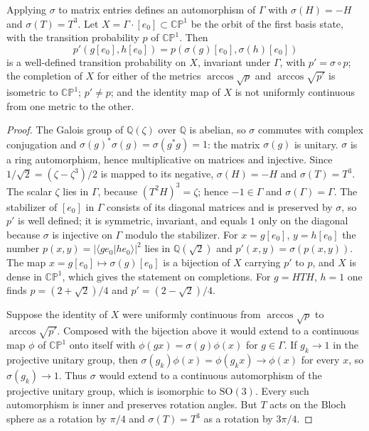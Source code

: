 \begin{proposition}\label{prop:galois}
Applying $\sigma$ to matrix entries defines an automorphism of $\Gamma$ with $\sigma(H)=-H$ and $\sigma(T)=T^3$. Let $X=\Gamma\cdot[e_0]\subset\mathbb{CP}^1$ be the orbit of the first basis state, with the transition probability $p$ of $\mathbb{CP}^1$. Then
\[
p'(g[e_0],h[e_0])=p(\sigma(g)[e_0],\sigma(h)[e_0])
\]
is a well-defined transition probability on $X$, invariant under $\Gamma$, with $p'=\sigma\circ p$; the completion of $X$ for either of the metrics $\arccos\sqrt p$ and $\arccos\sqrt{p'}$ is isometric to $\mathbb{CP}^1$; $p'\ne p$; and the identity map of $X$ is not uniformly continuous from one metric to the other.
\end{proposition}
\begin{proof}
The Galois group of $\mathbb{Q}(\zeta)$ over $\mathbb{Q}$ is abelian, so $\sigma$ commutes with complex conjugation and $\sigma(g)^*\sigma(g)=\sigma(g^*g)=1$: the matrix $\sigma(g)$ is unitary. $\sigma$ is a ring automorphism, hence multiplicative on matrices and injective. Since $1/\sqrt2=(\zeta-\zeta^3)/2$ is mapped to its negative, $\sigma(H)=-H$ and $\sigma(T)=T^3$. The scalar $\zeta$ lies in $\Gamma$, because $(T^2H)^3=\zeta$; hence $-1\in\Gamma$ and $\sigma(\Gamma)=\Gamma$. The stabilizer of $[e_0]$ in $\Gamma$ consists of its diagonal matrices and is preserved by $\sigma$, so $p'$ is well defined; it is symmetric, invariant, and equals $1$ only on the diagonal because $\sigma$ is injective on $\Gamma$ modulo the stabilizer. For $x=g[e_0]$, $y=h[e_0]$ the number $p(x,y)=|\langle ge_0|he_0\rangle|^2$ lies in $\mathbb{Q}(\sqrt2)$ and $p'(x,y)=\sigma(p(x,y))$. The map $x=g[e_0]\mapsto\sigma(g)[e_0]$ is a bijection of $X$ carrying $p'$ to $p$, and $X$ is dense in $\mathbb{CP}^1$, which gives the statement on completions. For $g=HTH$, $h=1$ one finds $p=(2+\sqrt2)/4$ and $p'=(2-\sqrt2)/4$.

Suppose the identity of $X$ were uniformly continuous from $\arccos\sqrt p$ to $\arccos\sqrt{p'}$. Composed with the bijection above it would extend to a continuous map $\phi$ of $\mathbb{CP}^1$ onto itself with $\phi(gx)=\sigma(g)\phi(x)$ for $g\in\Gamma$. If $g_k\to1$ in the projective unitary group, then $\sigma(g_k)\phi(x)=\phi(g_kx)\to\phi(x)$ for every $x$, so $\sigma(g_k)\to1$. Thus $\sigma$ would extend to a continuous automorphism of the projective unitary group, which is isomorphic to $\mathrm{SO}(3)$. Every such automorphism is inner and preserves rotation angles. But $T$ acts on the Bloch sphere as a rotation by $\pi/4$ and $\sigma(T)=T^3$ as a rotation by $3\pi/4$.
\end{proof}

